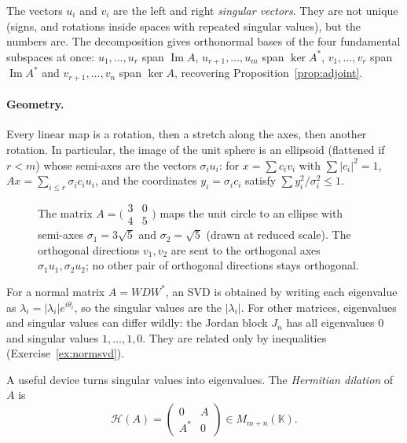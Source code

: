 The vectors $u_i$ and $v_i$ are the left and right \emph{singular vectors}. They are not unique (signs, and rotations inside
spaces with repeated singular values), but the numbers are. The decomposition gives orthonormal bases of the four
fundamental subspaces at once: $u_1,\dots,u_r$ span $\operatorname{Im}A$, $u_{r+1},\dots,u_m$ span $\ker A^*$, $v_1,\dots,v_r$
span $\operatorname{Im}A^*$ and $v_{r+1},\dots,v_n$ span $\ker A$, recovering Proposition~\ref{prop:adjoint}.

\paragraph{Geometry.} Every linear map is a rotation, then a stretch along the axes, then another rotation. In particular,
the image of the unit sphere is an ellipsoid (flattened if $r<m$) whose semi-axes are the vectors $\sigma_iu_i$: for
$x=\sum c_iv_i$ with $\sum|c_i|^2=1$, $Ax=\sum_{i\le r}\sigma_ic_iu_i$, and the coordinates $y_i=\sigma_ic_i$ satisfy $\sum
y_i^2/\sigma_i^2\le1$.

\begin{figure}[ht]
\centering
{}
\caption{The matrix $A=\bigl(\begin{smallmatrix}3&0\\4&5\end{smallmatrix}\bigr)$ maps the unit circle to an ellipse with
semi-axes $\sigma_1=3\sqrt5$ and $\sigma_2=\sqrt5$ (drawn at reduced scale). The orthogonal directions $v_1,v_2$ are sent to
the orthogonal axes $\sigma_1u_1,\sigma_2u_2$; no other pair of orthogonal directions stays orthogonal.}
\label{fig:ellipse}
\end{figure}

For a normal matrix $A=WDW^*$, an SVD is obtained by writing each eigenvalue as $\lambda_i=|\lambda_i|e^{i\theta_i}$, so the
singular values are the $|\lambda_i|$. For other matrices, eigenvalues and singular values can differ wildly: the Jordan
block $J_n$ has all eigenvalues $0$ and singular values $1,\dots,1,0$. They are related only by inequalities
(Exercise~\ref{ex:normsvd}).

A useful device turns singular values into eigenvalues. The \emph{Hermitian dilation} of $A$ is
\[
\mathcal H(A)=\begin{pmatrix}0&A\\A^*&0\end{pmatrix}\in M_{m+n}(\mathbb K).
\]

